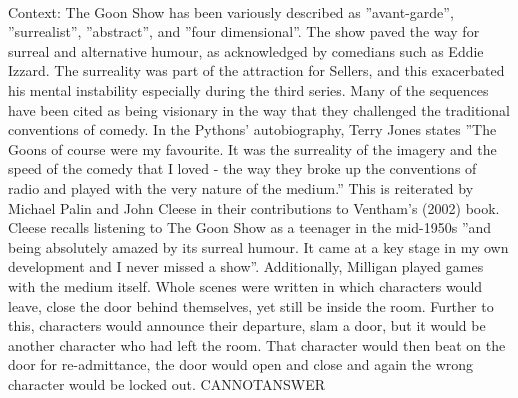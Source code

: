 \documentclass[11pt,a4paper, onecolumn]{article}
\begin{document}
\\ Context: The Goon Show has been variously described as ''avant-garde'', ''surrealist'', ''abstract'', and ''four dimensional''. The show paved the way for surreal and alternative humour, as acknowledged by comedians such as Eddie Izzard. The surreality was part of the attraction for Sellers, and this exacerbated his mental instability especially during the third series. Many of the sequences have been cited as being visionary in the way that they challenged the traditional conventions of comedy. In the Pythons' autobiography, Terry Jones states ''The Goons of course were my favourite. It was the surreality of the imagery and the speed of the comedy that I loved - the way they broke up the conventions of radio and played with the very nature of the medium.'' This is reiterated by Michael Palin and John Cleese in their contributions to Ventham's (2002) book. Cleese recalls listening to The Goon Show as a teenager in the mid-1950s ''and being absolutely amazed by its surreal humour. It came at a key stage in my own development and I never missed a show''. Additionally, Milligan played games with the medium itself. Whole scenes were written in which characters would leave, close the door behind themselves, yet still be inside the room. Further to this, characters would announce their departure, slam a door, but it would be another character who had left the room. That character would then beat on the door for re-admittance, the door would open and close and again the wrong character would be locked out. CANNOTANSWER
\end{document}
